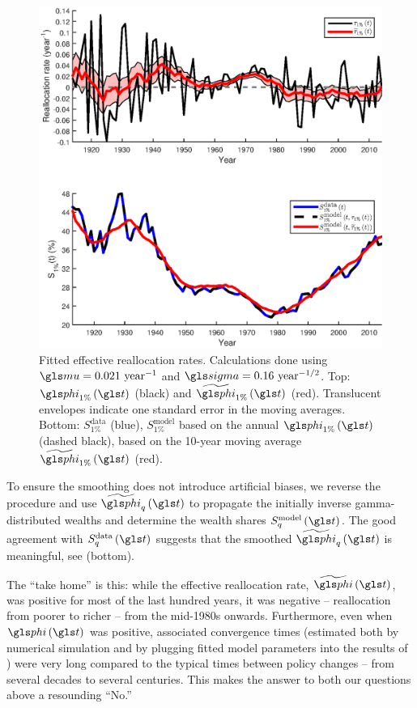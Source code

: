 \begin{figure}[!htb]
\centering
\includegraphics[width=1.0\textwidth] {./chapter_3/figs/tau_top1.eps}
\caption{Fitted effective reallocation rates. Calculations done using $\gmu=0.021 \text{ year}^{-1}$ and $\gsigma=0.16 \text{ year}^{-1/2}$. Top: $\gphi_{1\%}\left(\t\right)$ (black) and $\widetilde{\gphi}_{1\%}\left(\t\right)$ (red). Translucent envelopes indicate one standard error in the moving averages. Bottom: $S^{\text{data}}_{1\%}$ (blue), $S^{\text{model}}_{1\%}$ based on the annual $\gphi_{1\%}\left(\t\right)$ (dashed black), based on the 10-year moving average $\widetilde{\gphi}_{1\%}\left(\t\right)$ (red).}
\end{figure}

To ensure the smoothing does not introduce artificial biases, we reverse the procedure and use $\widetilde{\gphi}_q\left(\t\right)$ to propagate the initially inverse gamma-distributed wealths and determine the wealth shares $S^{\text{model}}_q\left(\t\right)$. The good agreement with $S^{\text{data}}_q\left(\t\right)$ suggests that the smoothed $\widetilde{\gphi}_q\left(\t\right)$ is meaningful, see  (bottom).

The ``take home'' is this: while the effective reallocation rate, $\widetilde{\gphi}\left(\t\right)$, was positive for most of the last hundred years, it was negative -- \ie reallocation from poorer to richer -- from the mid-1980s onwards. Furthermore, even when $\gphi\left(\t\right)$ was positive, associated convergence times (estimated both by numerical simulation and by plugging fitted model parameters into the results of ) were very long compared to the typical times between policy changes -- from several decades to several centuries. This makes the answer to both our questions above a resounding ``No.''

